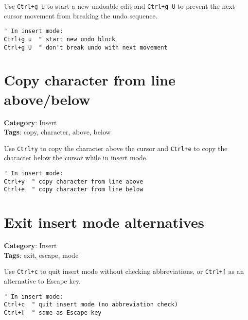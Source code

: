 {{{{{Use {\footnotesize \Verb§Ctrl+g u§} to start a new undoable edit and {\footnotesize \Verb§Ctrl+g U§} to prevent the next cursor movement from breaking the undo sequence.

\begin{Exa*}{}
\begin{Verbatim}[fontsize=\footnotesize, breaklines, breakanywhere]
" In insert mode:
Ctrl+g u  " start new undo block
Ctrl+g U  " don't break undo with next movement
\end{Verbatim}
\end{Exa*}

\section{Copy character from line above/below}

\textbf{Category}: Insert\\ \textbf{Tags}: copy, character, above, below
\vspace{0.5cm}

Use {\footnotesize \Verb§Ctrl+y§} to copy the character above the cursor and {\footnotesize \Verb§Ctrl+e§} to copy the character below the cursor while in insert mode.

\begin{Exa*}{}
\begin{Verbatim}[fontsize=\footnotesize, breaklines, breakanywhere]
" In insert mode:
Ctrl+y  " copy character from line above
Ctrl+e  " copy character from line below
\end{Verbatim}
\end{Exa*}

\section{Exit insert mode alternatives}

\textbf{Category}: Insert\\ \textbf{Tags}: exit, escape, mode
\vspace{0.5cm}

Use {\footnotesize \Verb§Ctrl+c§} to quit insert mode without checking abbreviations, or {\footnotesize \Verb§Ctrl+[§} as an alternative to Escape key.

\begin{Exa*}{}
\begin{Verbatim}[fontsize=\footnotesize, breaklines, breakanywhere]
" In insert mode:
Ctrl+c  " quit insert mode (no abbreviation check)
Ctrl+[  " same as Escape key
\end{Verbatim}
\end{Exa*}

}}}}}
